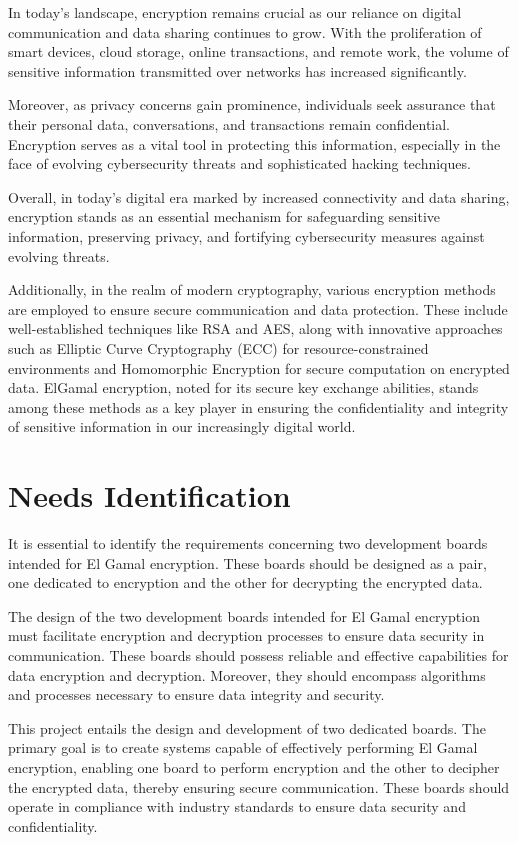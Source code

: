 \documentclass[12pt]{article}
\begin{document}
In today's landscape, encryption remains crucial as our reliance on digital communication and data sharing continues to grow. With the proliferation of smart devices, cloud storage, online transactions, and remote work, the volume of sensitive information transmitted over networks has increased significantly.

Moreover, as privacy concerns gain prominence, individuals seek assurance that their personal data, conversations, and transactions remain confidential. Encryption serves as a vital tool in protecting this information, especially in the face of evolving cybersecurity threats and sophisticated hacking techniques.

Overall, in today's digital era marked by increased connectivity and data sharing, encryption stands as an essential mechanism for safeguarding sensitive information, preserving privacy, and fortifying cybersecurity measures against evolving threats.

Additionally, in the realm of modern cryptography, various encryption methods are employed to ensure secure communication and data protection. These include well-established techniques like RSA and AES, along with innovative approaches such as Elliptic Curve Cryptography (ECC) for resource-constrained environments and Homomorphic Encryption for secure computation on encrypted data. ElGamal encryption, noted for its secure key exchange abilities, stands among these methods as a key player in ensuring the confidentiality and integrity of sensitive information in our increasingly digital world.

\vskip 20cm
	\section{Needs Identification}
It is essential to identify the requirements concerning two development boards intended for El Gamal encryption. These boards should be designed as a pair, one dedicated to encryption and the other for decrypting the encrypted data.


The design of the two development boards intended for El Gamal encryption must facilitate encryption and decryption processes to ensure data security in communication. These boards should possess reliable and effective capabilities for data encryption and decryption. Moreover, they should encompass algorithms and processes necessary to ensure data integrity and security.


This project entails the design and development of two dedicated boards. The primary goal is to create systems capable of effectively performing El Gamal encryption, enabling one board to perform encryption and the other to decipher the encrypted data, thereby ensuring secure communication. These boards should operate in compliance with industry standards to ensure data security and confidentiality.
\end{document}
